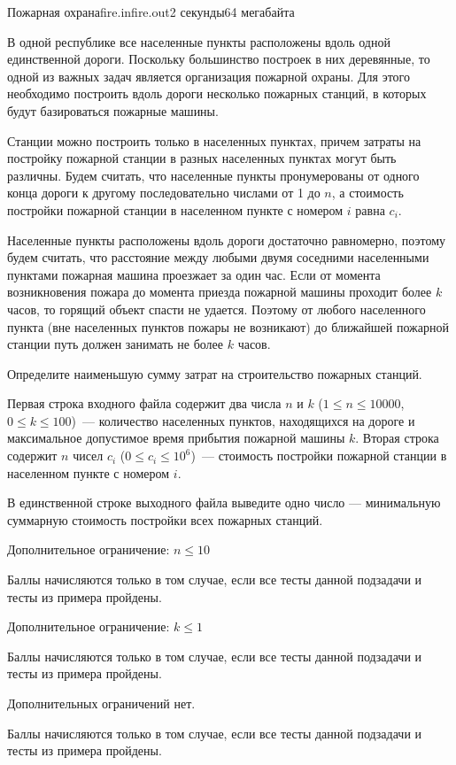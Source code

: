 \begin{problem}{Пожарная охрана}{fire.in}{fire.out}{2 секунды}{64 мегабайта}

В одной республике все населенные пункты расположены вдоль одной единственной 
дороги. Поскольку большинство построек в них деревянные, то одной из важных задач 
является организация пожарной охраны. Для этого необходимо построить вдоль дороги
несколько пожарных станций, в которых будут базироваться пожарные машины.

Станции можно построить только в населенных пунктах, причем затраты на постройку
пожарной станции в разных населенных пунктах могут быть различны. Будем считать, что 
населенные пункты пронумерованы от одного конца дороги к другому последовательно 
числами от 1 до $n$, а стоимость постройки пожарной станции в населенном пункте
с номером $i$ равна $c_i$.

Населенные пункты расположены вдоль дороги достаточно равномерно, поэтому будем
считать, что расстояние между любыми двумя соседними населенными пунктами пожарная машина
проезжает за один час. Если от момента возникновения пожара до момента приезда
пожарной машины проходит более $k$ часов, то горящий объект спасти не удается.
Поэтому от любого населенного пункта (вне населенных пунктов пожары не возникают) до 
ближайшей пожарной станции путь должен занимать не более $k$ часов.

Определите наименьшую сумму затрат на строительство пожарных станций.


\InputFile
Первая строка входного файла содержит два числа $n$ и $k$ ($1 \le n \le 10000$, $0 \le k \le 100$)~--- количество 
населенных пунктов, находящихся на дороге и максимальное допустимое время прибытия 
пожарной машины $k$.
Вторая строка содержит $n$ чисел $c_i$ ($0 \le c_i \le 10^{6}$)~--- стоимость постройки 
пожарной станции в населенном пункте с номером $i$.


\OutputFile
В единственной строке выходного файла выведите одно число --- минимальную суммарную стоимость 
постройки всех пожарных станций.


\Scoring
\SubtaskOne
Дополнительное ограничение:
$n \le 10$

Баллы начисляются только в том случае, если все тесты данной подзадачи и тесты из примера пройдены.

\SubtaskTwo
Дополнительное ограничение:
$k \le 1$

Баллы начисляются только в том случае, если все тесты данной подзадачи и тесты из примера пройдены.

\SubtaskThree
Дополнительных ограничений нет.

Баллы начисляются только в том случае, если все тесты данной подзадачи и тесты из примера пройдены.


\Examples

\begin{example}
%
%
\end{example}

\end{problem}

